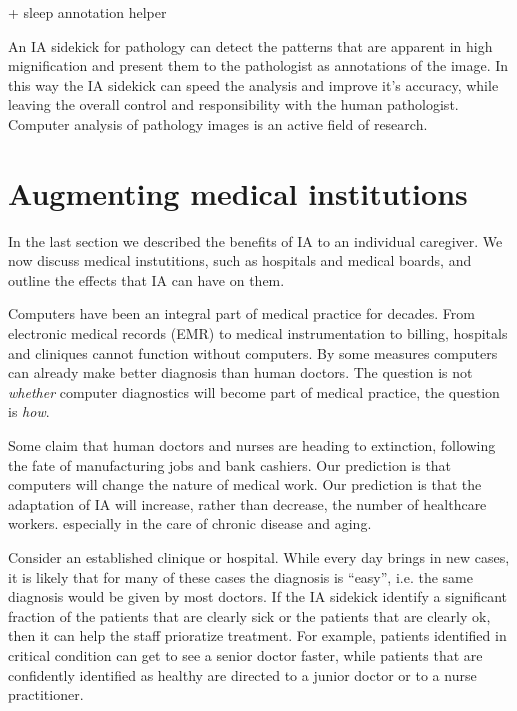 \documentclass[11pt]{pnas-new}
\begin{document}
+ sleep annotation helper

An IA sidekick for pathology can detect the patterns that are apparent
in high mignification and present them to the pathologist as
annotations of the image. In this way the IA sidekick can speed the
analysis and improve it's accuracy, while leaving the overall control
and responsibility with the human pathologist. Computer analysis of
pathology images is an active field of research.\cite{}


\section{Augmenting medical institutions}

In the last section we described the benefits of IA to an individual
caregiver. We now discuss medical instutitions, such as hospitals and
medical boards, and outline the effects that IA can have on them.

  Computers have been an integral part of medical practice for decades. From
  electronic medical records (EMR) to medical instrumentation to billing,
  hospitals and cliniques cannot function without computers. By some
  measures computers can already make better diagnosis than human
  doctors. The question is not {\em whether} computer diagnostics will
  become part of medical practice, the question is {\em how}.

  
  Some claim that human doctors and nurses are heading to extinction,
  following the fate of manufacturing jobs and bank cashiers.  Our
  prediction is that computers will change the nature of medical
  work. Our prediction is that the adaptation of IA will increase,
  rather than decrease, the number of healthcare workers. especially
  in the care of chronic disease and aging.

  Consider an established clinique or hospital. While every day brings
  in new cases, it is likely that for many of these cases the
  diagnosis is ``easy'', i.e. the same diagnosis would be given by
  most doctors. If the IA sidekick identify a significant fraction of
  the patients that are clearly sick or the patients that are clearly
  ok, then it can help the staff prioratize treatment. For example,
  patients identified in critical condition can get to see a senior
  doctor faster, while patients that are confidently identified as
  healthy are directed to a junior doctor or to a nurse practitioner.
\end{document}
